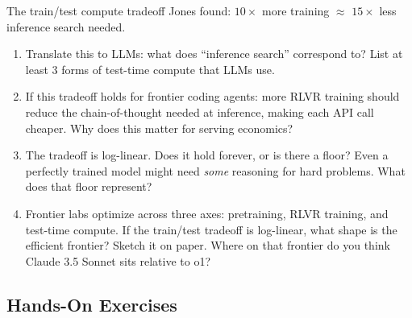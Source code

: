 \begin{thinkfirst}{The train/test compute tradeoff}
Jones found: $10\times$ more training $\approx$ $15\times$ less inference search needed.

\begin{enumerate}
  \item Translate this to LLMs: what does ``inference search'' correspond to? List at least 3 forms of test-time compute that LLMs use.

  \item If this tradeoff holds for frontier coding agents: more RLVR training should reduce the chain-of-thought needed at inference, making each API call cheaper. Why does this matter for serving economics?

  \item The tradeoff is log-linear. Does it hold forever, or is there a floor? Even a perfectly trained model might need \textit{some} reasoning for hard problems. What does that floor represent?

  \item Frontier labs optimize across three axes: pretraining, RLVR training, and test-time compute. If the train/test tradeoff is log-linear, what shape is the efficient frontier? Sketch it on paper. Where on that frontier do you think Claude 3.5 Sonnet sits relative to o1?
\end{enumerate}
\end{thinkfirst}

\subsection{Hands-On Exercises}

